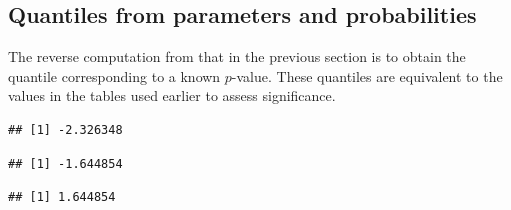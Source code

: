 \documentclass[krantz2]{krantz}\usepackage{knitr}
\begin{document}
\subsection{Quantiles from parameters and probabilities}\label{sec:quant:prob}

The reverse computation from that in the previous section is to obtain the quantile corresponding to a known $p$-value. These quantiles are equivalent to the values in the tables used earlier to assess significance.

\begin{knitrout}\footnotesize
{}\color{fgcolor}\begin{kframe}
\begin{alltt}
\hlstd{(} \hlstd{=} \hlstd{,}  \hlstd{=} \hlstd{,}  \hlstd{=} \hlstd{)}
\end{alltt}
\begin{verbatim}
## [1] -2.326348
\end{verbatim}
\begin{alltt}
\hlstd{(} \hlstd{=} \hlstd{,}  \hlstd{=} \hlstd{,}  \hlstd{=} \hlstd{)}
\end{alltt}
\begin{verbatim}
## [1] -1.644854
\end{verbatim}
\begin{alltt}
\hlstd{(} \hlstd{=} \hlstd{,}  \hlstd{=} \hlstd{,}  \hlstd{=} \hlstd{,}  \hlstd{=} \hlstd{)}
\end{alltt}
\begin{verbatim}
## [1] 1.644854
\end{verbatim}
\end{kframe}
\end{knitrout}
\end{document}

